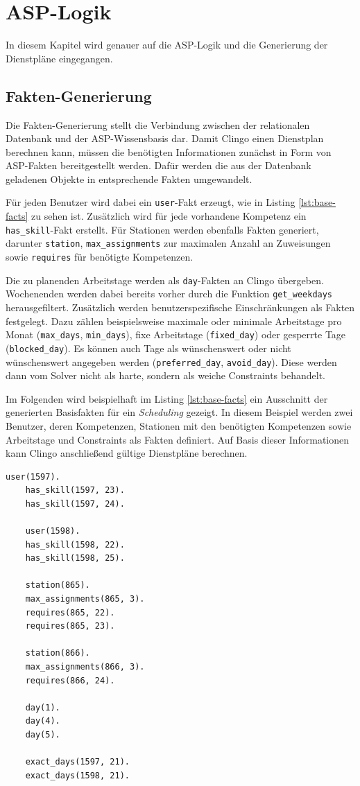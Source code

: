 
\chapter{ASP-Logik}
\label{sec:asp}
In diesem Kapitel wird genauer auf die ASP-Logik und die Generierung der Dienstpläne eingegangen.
\section{Fakten-Generierung}
Die Fakten-Generierung stellt die Verbindung zwischen der relationalen Datenbank und der ASP-Wissensbasis dar. Damit Clingo einen Dienstplan berechnen kann, müssen die benötigten Informationen zunächst in Form von ASP-Fakten bereitgestellt werden. Dafür werden die aus der Datenbank geladenen Objekte in entsprechende Fakten umgewandelt.

Für jeden Benutzer wird dabei ein \texttt{user}-Fakt erzeugt, wie in Listing \ref{lst:base-facts} zu sehen ist. Zusätzlich wird für jede vorhandene Kompetenz ein \texttt{has\_skill}-Fakt erstellt. Für Stationen werden ebenfalls Fakten generiert, darunter \texttt{station}, \texttt{max\_assignments} zur maximalen Anzahl an Zuweisungen sowie \texttt{requires} für benötigte Kompetenzen.

Die zu planenden Arbeitstage werden als \texttt{day}-Fakten an Clingo übergeben. Wochenenden werden dabei bereits vorher durch die Funktion \texttt{get\_weekdays} herausgefiltert. Zusätzlich werden benutzerspezifische Einschränkungen als Fakten festgelegt. Dazu zählen beispielsweise maximale oder minimale Arbeitstage pro Monat (\texttt{max\_days}, \texttt{min\_days}), fixe Arbeitstage (\texttt{fixed\_day}) oder gesperrte Tage (\texttt{blocked\_day}). Es können auch Tage als wünschenswert oder nicht wünschenswert angegeben werden (\texttt{preferred\_day}, \texttt{avoid\_day}).
Diese werden dann vom Solver nicht als harte, sondern als weiche Constraints behandelt.

Im Folgenden wird beispielhaft im Listing \ref{lst:base-facts} ein Ausschnitt der generierten Basisfakten für ein \textit{Scheduling} gezeigt. In diesem Beispiel werden zwei Benutzer, deren Kompetenzen, Stationen mit den benötigten Kompetenzen sowie Arbeitstage und Constraints als Fakten definiert. Auf Basis dieser Informationen kann Clingo anschließend gültige Dienstpläne berechnen.

\begin{lstlisting}[caption={Beispiel generierter Basisfakten},label={lst:base-facts}]
	user(1597).
	has_skill(1597, 23).
	has_skill(1597, 24).
	
	user(1598).
	has_skill(1598, 22).
	has_skill(1598, 25).
	
	station(865).
	max_assignments(865, 3).
	requires(865, 22).
	requires(865, 23).
	
	station(866).
	max_assignments(866, 3).
	requires(866, 24).
	
	day(1).
	day(4).
	day(5).
	
	exact_days(1597, 21).
	exact_days(1598, 21).
\end{lstlisting}


